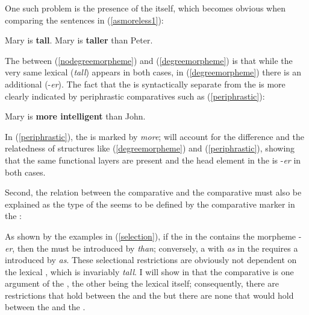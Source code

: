 One such problem is the presence of the  itself, which becomes obvious when comparing the sentences in (\ref{asmoreless1}):

\ea \label{degreeparadigm1}
\ea Mary is \textbf{tall}. \label{nodegreemorpheme}
\ex	Mary is \textbf{taller} than Peter. \label{degreemorpheme}
\z
\z

The  between (\ref{nodegreemorpheme}) and (\ref{degreemorpheme}) is that while the very same lexical  (\textit{tall}) appears in both cases, in (\ref{degreemorpheme}) there is an additional  (-\textit{er}). The fact that the  is syntactically separate from the  is more clearly indicated by periphrastic comparatives such as (\ref{periphrastic}):

\ea Mary is \textbf{more intelligent} than John. \label{periphrastic}
\z

In (\ref{periphrastic}), the  is marked by \textit{more};  will account for the difference and the relatedness of structures like (\ref{degreemorpheme}) and (\ref{periphrastic}), showing that the same functional layers are present and the head element in the  is -\textit{er} in both cases.

Second, the relation between the comparative  and the comparative  must also be explained as the type of the  seems to be defined by the comparative marker in the :

\ea \label{selection}
\z
\z

As shown by the examples in (\ref{selection}), if the  in the  contains the morpheme -\textit{er}, then the  must be introduced by \textit{than}; conversely, a  with \textit{as} in the  requires a  introduced by \textit{as}. These selectional restrictions are obviously not dependent on the lexical , which is invariably \textit{tall}. I will show in  that the comparative  is one argument of the , the other being the lexical  itself; consequently, there are restrictions that hold between the  and the  but there are none that would hold between the  and the .

